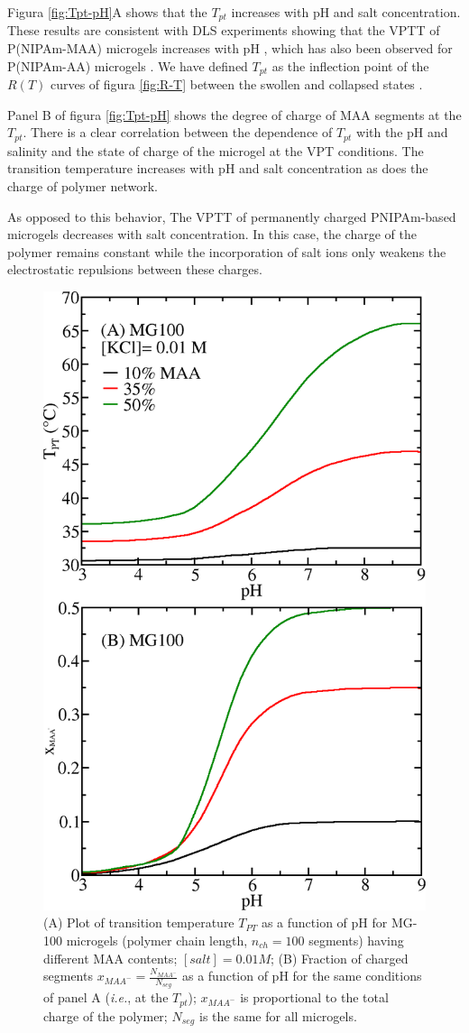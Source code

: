 Figura \ref{fig:Tpt-pH}A shows that the $T_{pt}$ increases with pH and salt concentration.
These results are consistent with DLS experiments showing that the VPTT of P(NIPAm-MAA) microgels increases with pH \addcite[Kleinen2008], which has also been observed for P(NIPAm-AA) microgels \addcite[CaprilesGonzalez2008].
We have defined $T_{pt}$ as the inflection point of the $R(T)$ curves of figura \ref{fig:R-T} between the swollen and collapsed states \addcite[Kratz2001].






Panel B of figura \ref{fig:Tpt-pH} shows the degree of charge of MAA segments at the $T_{pt}$.
There is a clear correlation between the dependence of $T_{pt}$ with the pH and salinity and the state of charge of the microgel at the VPT conditions.
The transition temperature increases with pH and salt concentration as does the charge of polymer network.

As opposed to this behavior, The VPTT of permanently charged PNIPAm-based microgels decreases with salt concentration\addcite[Lopez2020].
In this case, the charge of the polymer remains constant while the incorporation of salt ions only weakens the electrostatic repulsions between these charges.







\begin{figure}[!tb]
	\centering
	\includegraphics[width=0.5\linewidth]{Figures/graph-gel/Tpt-pH_MAA.png}
	\caption{(A) Plot of transition temperature $T_{PT}$ as a function of pH for MG-100 microgels (polymer chain length, $n_{ch}=100$ segments) having different MAA contents; $[salt]=0.01 M$;
		(B) Fraction of charged segments $x_{MAA^-}=\frac{N_{MAA^-}}{N_{seg}}$ as a function of pH for the same conditions of panel A (\emph{i.e.}, at the $T_{pt}$); $x_{MAA^-}$ is proportional to the total charge of the polymer; $N_{seg}$ is the same for all microgels.}
	\label{fig:Tpt_MAA}
\end{figure}



